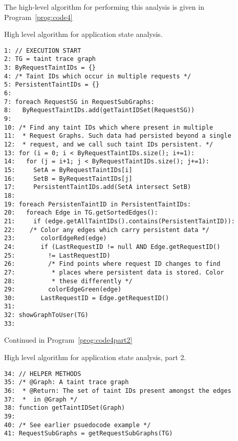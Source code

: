 \documentclass[msc,oneside]{ubcthesis}
\begin{document}
The high-level algorithm for performing this analysis is given in Program~\ref{prog:code4}

\begin{Program}
  \caption{\label{prog:code4} High level algorithm for application state analysis.}
\begin{verbatim}
1: // EXECUTION START
2: TG = taint trace graph
3: ByRequestTaintIDs = {}
4: /* Taint IDs which occur in multiple requests */
5: PersistentTaintIDs = {}
6: 
7: foreach RequestSG in RequestSubGraphs:
8:   ByRequestTaintIDs.add(getTaintIDSet(RequestSG))
9:   
10: /* Find any taint IDs which where present in multiple 
11:  * Request Graphs. Such data had persisted beyond a single
12:  * request, and we call such taint IDs persistent. */
13: for (i = 0; i < ByRequestTaintIDs.size(); i+=1):
14:   for (j = i+1; j < ByRequestTaintIDs.size(); j+=1):
15:     SetA = ByRequestTaintIDs[i]
16:     SetB = ByRequestTaintIDs[j]
17:     PersistentTaintIDs.add(SetA intersect SetB)
18: 
19: foreach PersistenTaintID in PersistentTaintIDs:
20:   foreach Edge in TG.getSortedEdges():
21:     if (edge.getAllTaintIDs().contains(PersistentTaintID)):
22:    /* Color any edges which carry persistent data */
23:       colorEdgeRed(edge)
24:       if (LastRequestID != null AND Edge.getRequestID() 
25:         != LastRequestID)
26:         /* Find points where request ID changes to find
27:          * places where persistent data is stored. Color
28:          * these differently */
29:         colorEdgeGreen(edge)
30:       LastRequestID = Edge.getRequestID()
31:       
32: showGraphToUser(TG)
33: 
\end{verbatim}
Continued in Program~\ref{prog:code4part2}
\end{Program}
\begin{Program}
  \caption{\label{prog:code4part2} High level algorithm for application state analysis, part 2.}
\begin{verbatim}
34: // HELPER METHODS
35: /* @Graph: A taint trace graph
36:  * @Return: The set of taint IDs present amongst the edges
37:  *  in @Graph */
38: function getTaintIDSet(Graph)
39: 
40: /* See earlier psuedocode example */
41: RequestSubGraphs = getRequestSubGraphs(TG)
\end{verbatim}
\end{Program}
\end{document}
